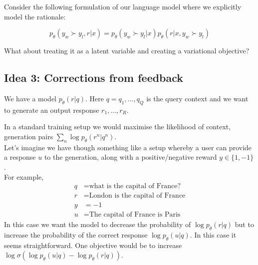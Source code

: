 Consider the following formulation of our language model where we explicitly model the rationale:

\begin{equation}
    p_{\theta}(y_{w} \succ y_{l}, r | x) = p_{\theta}(y_{w} \succ y_{l} | x) p_{\theta}(r | x, y_{w} \succ y_{l} )
\end{equation}

What about treating it as a latent variable and creating a variational objective?


\subsection{Idea 3: Corrections from feedback}

We have a model $p_\theta(r|q)$. Here $q = q_1,\ldots, q_{Q}$ is the query context and we want to generate an output response $r_1,\ldots, r_R$.

In a standard training setup we would maximise the likelihood of context, generation pairs $\sum_n \log p_\theta(r^n|q^n)$.\\

Let's imagine we have though something like a setup whereby a user can provide a response $u$ to the generation, along with a positive/negative reward $y\in\{1,-1\}$.\\

For example,
\begin{align}
    q & =\text{what is the capital of France?}  \\
    r & =\text{London is the capital of France} \\
    y & =-1                                     \\
    u & =\text{The capital of France is Paris}
\end{align}
In this case we want the model to decrease the probability of $\log p_\theta(r|q)$ but to increase the probability of the correct response $\log p_\theta(u|q)$.  In this case it seems straightforward.  One objective would be to increase  $\log \sigma\left(\log p_\theta(u|q) - \log p_\theta(r|q)\right)$.\\

